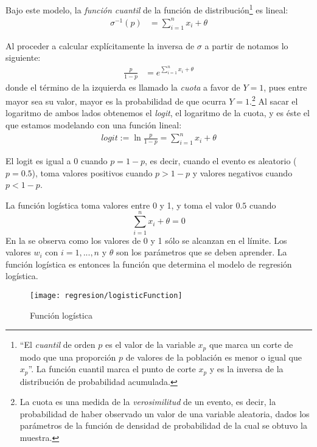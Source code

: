 Bajo este modelo, la \emph{función cuantil} de la función de distribución\footnote{``El \textit{cuantil} de orden $p$ es el valor de la variable $x_p$ que marca un corte de modo que una proporción $p$ de valores de la población es menor o igual que $x_{p}$''.  La función cuantil marca el punto de corte $x_p$ y es la inversa de la distribución de probabilidad acumulada. } es lineal:
\begin{align}
 \sigma^{-1}(p) &= \sum_{i=1}^n x_i + \theta \label{eq:cuantil}
\end{align}

Al proceder a calcular explícitamente la inversa de $\sigma$ a partir de  notamos lo siguiente:
\begin{align*}
 \frac{p}{1-p} &= e^{\sum_{i=1}^n x_i + \theta}
\end{align*}
donde el término de la izquierda es llamado la \emph{cuota} a favor de $Y=1$, pues entre mayor sea su valor, mayor es la probabilidad de que ocurra $Y=1$.\footnote{La cuota es una medida de la \emph{verosimilitud} de un evento, es decir, la probabilidad de haber observado un valor de una variable aleatoria, dados los parámetros de la función de densidad de probabilidad de la cual se obtuvo la muestra. }  Al sacar el logaritmo de ambos lados obtenemos el \emph{logit}, el logaritmo de la cuota, y es éste el que estamos modelando con una función lineal:
\begin{align*}
logit := \ln \frac{p}{1-p} = \sum_{i=1}^n x_i + \theta
\end{align*}

El logit es igual a 0 cuando $ p = 1-p$, es decir, cuando el evento es aleatorio ($p = 0.5$), toma valores positivos cuando $p > 1-p$ y valores negativos cuando $p < 1-p$.

La función logística toma valores entre 0 y 1, y toma el valor $0.5$ cuando $$\sum_{i=1}^n x_i + \theta = 0$$ En la  se observa como los valores de 0 y 1 sólo se alcanzan en el límite. Los valores $w_i$ con $i=1,...,n$ y $\theta$ son los parámetros que se deben aprender. La función logística es entonces la función que determina el modelo de regresión logística.


\begin{figure}
 \centering
 \texttt{[image: regresion/logisticFunction]}
 \caption{Función logística}\label{Fig:Logistic}
\end{figure}




